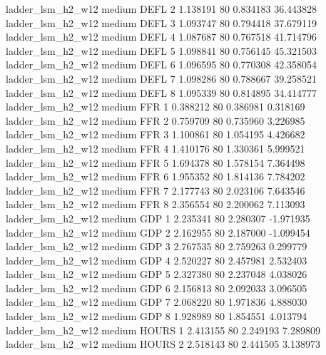   ladder_lsm_h2_w12     medium     DEFL                 2  1.138191 80       0.834183          36.443828
  ladder_lsm_h2_w12     medium     DEFL                 3  1.093747 80       0.794418          37.679119
  ladder_lsm_h2_w12     medium     DEFL                 4  1.087687 80       0.767518          41.714796
  ladder_lsm_h2_w12     medium     DEFL                 5  1.098841 80       0.756145          45.321503
  ladder_lsm_h2_w12     medium     DEFL                 6  1.096595 80       0.770308          42.358054
  ladder_lsm_h2_w12     medium     DEFL                 7  1.098286 80       0.788667          39.258521
  ladder_lsm_h2_w12     medium     DEFL                 8  1.095339 80       0.814895          34.414777
  ladder_lsm_h2_w12     medium      FFR                 1  0.388212 80       0.386981           0.318169
  ladder_lsm_h2_w12     medium      FFR                 2  0.759709 80       0.735960           3.226985
  ladder_lsm_h2_w12     medium      FFR                 3  1.100861 80       1.054195           4.426682
  ladder_lsm_h2_w12     medium      FFR                 4  1.410176 80       1.330361           5.999521
  ladder_lsm_h2_w12     medium      FFR                 5  1.694378 80       1.578154           7.364498
  ladder_lsm_h2_w12     medium      FFR                 6  1.955352 80       1.814136           7.784202
  ladder_lsm_h2_w12     medium      FFR                 7  2.177743 80       2.023106           7.643546
  ladder_lsm_h2_w12     medium      FFR                 8  2.356554 80       2.200062           7.113093
  ladder_lsm_h2_w12     medium      GDP                 1  2.235341 80       2.280307          -1.971935
  ladder_lsm_h2_w12     medium      GDP                 2  2.162955 80       2.187000          -1.099454
  ladder_lsm_h2_w12     medium      GDP                 3  2.767535 80       2.759263           0.299779
  ladder_lsm_h2_w12     medium      GDP                 4  2.520227 80       2.457981           2.532403
  ladder_lsm_h2_w12     medium      GDP                 5  2.327380 80       2.237048           4.038026
  ladder_lsm_h2_w12     medium      GDP                 6  2.156813 80       2.092033           3.096505
  ladder_lsm_h2_w12     medium      GDP                 7  2.068220 80       1.971836           4.888030
  ladder_lsm_h2_w12     medium      GDP                 8  1.928989 80       1.854551           4.013794
  ladder_lsm_h2_w12     medium    HOURS                 1  2.413155 80       2.249193           7.289809
  ladder_lsm_h2_w12     medium    HOURS                 2  2.518143 80       2.441505           3.138973

